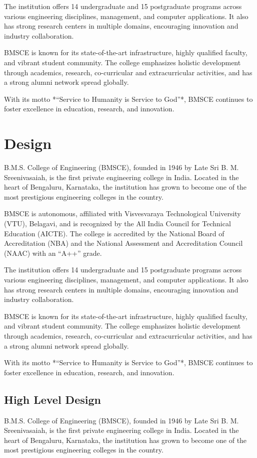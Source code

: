 \documentclass[12pt,a4paper]{report}
\begin{document}
The institution offers 14 undergraduate and 15 postgraduate programs across various 
engineering disciplines, management, and computer applications. It also has strong research 
centers in multiple domains, encouraging innovation and industry collaboration. 

BMSCE is known for its state-of-the-art infrastructure, highly qualified faculty, and vibrant 
student community. The college emphasizes holistic development through academics, research, 
co-curricular and extracurricular activities, and has a strong alumni network spread 
globally. 

With its motto *“Service to Humanity is Service to God”*, BMSCE continues to foster 
excellence in education, research, and innovation.
 


\chapter{Design}
B.M.S. College of Engineering (BMSCE), founded in 1946 by Late Sri B. M. Sreenivasaiah, 
is the first private engineering college in India. Located in the heart of Bengaluru, 
Karnataka, the institution has grown to become one of the most prestigious engineering 
colleges in the country. 

BMSCE is autonomous, affiliated with Visvesvaraya Technological University (VTU), Belagavi, 
and is recognized by the All India Council for Technical Education (AICTE). The college is 
accredited by the National Board of Accreditation (NBA) and the National Assessment and 
Accreditation Council (NAAC) with an “A++” grade.

The institution offers 14 undergraduate and 15 postgraduate programs across various 
engineering disciplines, management, and computer applications. It also has strong research 
centers in multiple domains, encouraging innovation and industry collaboration. 

BMSCE is known for its state-of-the-art infrastructure, highly qualified faculty, and vibrant 
student community. The college emphasizes holistic development through academics, research, 
co-curricular and extracurricular activities, and has a strong alumni network spread 
globally. 

With its motto *“Service to Humanity is Service to God”*, BMSCE continues to foster 
excellence in education, research, and innovation.
\section{ High Level Design }
B.M.S. College of Engineering (BMSCE), founded in 1946 by Late Sri B. M. Sreenivasaiah, 
is the first private engineering college in India. Located in the heart of Bengaluru, 
Karnataka, the institution has grown to become one of the most prestigious engineering 
colleges in the country. 
\end{document}

